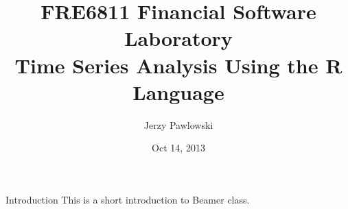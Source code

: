 \documentclass{beamer}
\title[AlphaLabs]{FRE6811 Financial Software Laboratory\\Time Series Analysis Using the R Language}
\author{Jerzy Pawlowski}
\institute{NYU Polytechnic Institute}
\date{Oct 14, 2013}
\begin{document}
\begin{frame}
\titlepage
\end{frame}


\begin{frame}{Introduction}
This is a short introduction to Beamer class.
\end{frame}
\end{document}

